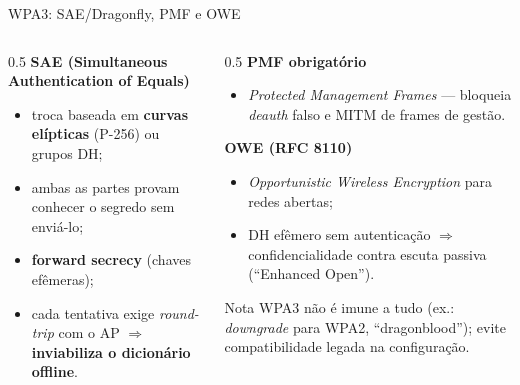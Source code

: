 \documentclass[aspectratio=169,11pt]{beamer}
\begin{document}
\begin{frame}{WPA3: SAE/Dragonfly, PMF e OWE}
  \begin{columns}
    \begin{column}{0.5\textwidth}
      \textbf{SAE (Simultaneous Authentication of Equals)}
      \begin{itemize}
        \item troca baseada em \textbf{curvas elípticas} (P-256) ou grupos DH;
        \item ambas as partes provam conhecer o segredo sem enviá-lo;
        \item \textbf{forward secrecy} (chaves efêmeras);
        \item cada tentativa exige \emph{round-trip} com o AP $\Rightarrow$ \textbf{inviabiliza o dicionário offline}.
      \end{itemize}
    \end{column}
    \begin{column}{0.5\textwidth}
      \textbf{PMF obrigatório}
      \begin{itemize}
        \item \emph{Protected Management Frames} --- bloqueia \emph{deauth} falso e MITM de frames de gestão.
      \end{itemize}
      \textbf{OWE (RFC 8110)}
      \begin{itemize}
        \item \emph{Opportunistic Wireless Encryption} para redes abertas;
        \item DH efêmero sem autenticação $\Rightarrow$ confidencialidade contra escuta passiva (``Enhanced Open'').
      \end{itemize}
      \begin{alertblock}{Nota}
        WPA3 não é imune a tudo (ex.: \emph{downgrade} para WPA2, ``dragonblood''); evite compatibilidade legada na configuração.
      \end{alertblock}
    \end{column}
  \end{columns}
\end{frame}
\end{document}
